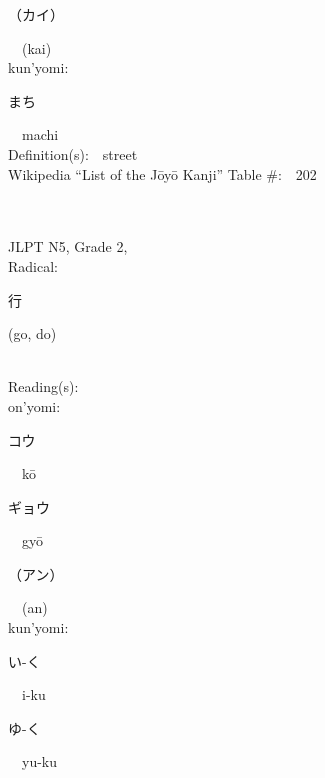 \begin{multicols}{2}
{\hspace*{2em}}{\begin{CJK}{UTF8}{min} （カイ） \end{CJK}}\ \ (kai)\ \ \\
{\hspace*{1em}}kun'yomi:\ \ \\
{\hspace*{2em}}{\begin{CJK}{UTF8}{min} まち \end{CJK}}\ \ machi\ \ \\
Definition(s):\ \ street \\
Wikipedia ``List of the J\=oy\=o Kanji'' Table \#:\ \ 202 \\
\ \ \\
{\fontsize{34pt}{40pt}  }\ \ \\  %
{JLPT N5, Grade 2, \\Radical:\ \ {\begin{CJK}{UTF8}{min} 行 \end{CJK}} (go, do) } \\
Reading(s):\ \ \\
{\hspace*{1em}}on'yomi:\ \ \\
{\hspace*{2em}}{\begin{CJK}{UTF8}{min} コウ \end{CJK}}\ \ k\=o\ \ \\
{\hspace*{2em}}{\begin{CJK}{UTF8}{min} ギョウ \end{CJK}}\ \ gy\=o\ \ \\
{\hspace*{2em}}{\begin{CJK}{UTF8}{min} （アン） \end{CJK}}\ \ (an)\ \ \\
{\hspace*{1em}}kun'yomi:\ \ \\
{\hspace*{2em}}{\begin{CJK}{UTF8}{min} い-く \end{CJK}}\ \ i-ku\ \ \\
{\hspace*{2em}}{\begin{CJK}{UTF8}{min} ゆ-く \end{CJK}}\ \ yu-ku\ \ \\

\end{multicols}

